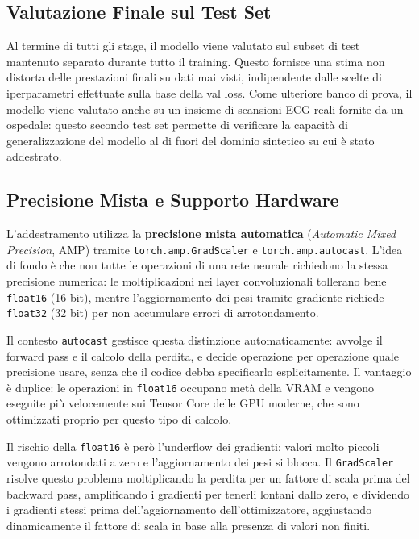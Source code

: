 \subsection{Valutazione Finale sul Test Set}

Al termine di tutti gli stage, il modello viene valutato sul subset di test mantenuto separato durante tutto il training. Questo fornisce una stima non distorta delle prestazioni finali su dati mai visti, indipendente dalle scelte di iperparametri effettuate sulla base della val loss. Come ulteriore banco di prova, il modello viene valutato anche su un insieme di scansioni ECG reali fornite da un ospedale: questo secondo test set permette di verificare la capacità di generalizzazione del modello al di fuori del dominio sintetico su cui è stato addestrato.

\subsection{Precisione Mista e Supporto Hardware}\label{sec:amp}

L'addestramento utilizza la \textbf{precisione mista automatica} (\textit{Automatic Mixed Precision}, AMP) tramite \texttt{torch.amp.GradScaler} e \texttt{torch.amp.autocast}. L'idea di fondo è che non tutte le operazioni di una rete neurale richiedono la stessa precisione numerica: le moltiplicazioni nei layer convoluzionali tollerano bene \texttt{float16} (16 bit), mentre l'aggiornamento dei pesi tramite gradiente richiede \texttt{float32} (32 bit) per non accumulare errori di arrotondamento.

Il contesto \texttt{autocast} gestisce questa distinzione automaticamente: avvolge il forward pass e il calcolo della perdita, e decide operazione per operazione quale precisione usare, senza che il codice debba specificarlo esplicitamente. Il vantaggio è duplice: le operazioni in \texttt{float16} occupano metà della VRAM e vengono eseguite più velocemente sui Tensor Core delle GPU moderne, che sono ottimizzati proprio per questo tipo di calcolo.

Il rischio della \texttt{float16} è però l'underflow dei gradienti: valori molto piccoli vengono arrotondati a zero e l'aggiornamento dei pesi si blocca. Il \texttt{GradScaler} risolve questo problema moltiplicando la perdita per un fattore di scala prima del backward pass, amplificando i gradienti per tenerli lontani dallo zero, e dividendo i gradienti stessi prima dell'aggiornamento dell'ottimizzatore, aggiustando dinamicamente il fattore di scala in base alla presenza di valori non finiti.

